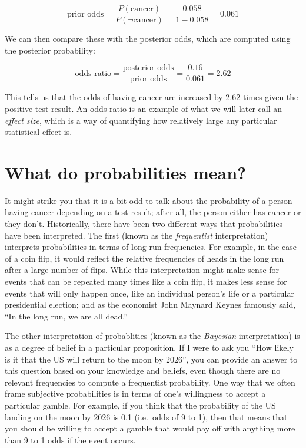 \documentclass[12pt,]{book}
\theoremstyle{definition}
\theoremstyle{definition}
\theoremstyle{definition}
\theoremstyle{remark}
\begin{document}
\[
\text{prior odds} = \frac{P(\text{cancer})}{P(\neg \text{cancer})} =\frac{0.058}{1 - 0.058} = 0.061
\]

We can then compare these with the posterior odds, which are computed using the posterior probability:

\[
\text{odds ratio} = \frac{\text{posterior odds}}{\text{prior odds}} = \frac{0.16}{0.061} = 2.62
\]

This tells us that the odds of having cancer are increased by 2.62 times given the positive test result. An odds ratio is an example of what we will later call an \emph{effect size}, which is a way of quantifying how relatively large any particular statistical effect is.

\hypertarget{what-do-probabilities-mean}{%
\section{What do probabilities mean?}\label{what-do-probabilities-mean}}

It might strike you that it is a bit odd to talk about the probability of a person having cancer depending on a test result; after all, the person either has cancer or they don't. Historically, there have been two different ways that probabilities have been interpreted. The first (known as the \emph{frequentist} interpretation) interprets probabilities in terms of long-run frequencies. For example, in the case of a coin flip, it would reflect the relative frequencies of heads in the long run after a large number of flips. While this interpretation might make sense for events that can be repeated many times like a coin flip, it makes less sense for events that will only happen once, like an individual person's life or a particular presidential election; and as the economist John Maynard Keynes famously said, ``In the long run, we are all dead.''

The other interpretation of probablities (known as the \emph{Bayesian} interpretation) is as a degree of belief in a particular proposition. If I were to ask you ``How likely is it that the US will return to the moon by 2026'', you can provide an answer to this question based on your knowledge and beliefs, even though there are no relevant frequencies to compute a frequentist probability. One way that we often frame subjective probabilities is in terms of one's willingness to accept a particular gamble. For example, if you think that the probability of the US landing on the moon by 2026 is 0.1 (i.e.~odds of 9 to 1), then that means that you should be willing to accept a gamble that would pay off with anything more than 9 to 1 odds if the event occurs.
\end{document}
